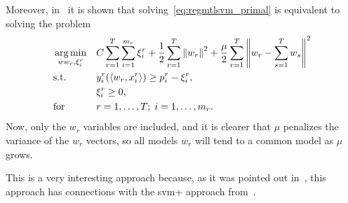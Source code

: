 Moreover, in~\cite{EvgeniouP04} it is shown that solving~\eqref{eq:regmtlsvm_primal} is equivalent to solving the problem
\begin{equation}
    \nonumber
    \begin{aligned}
        & \operatorname*{arg\min}_{ww_r, \xi_i^r}
        & & C \sum_{r=1}^T \sum_{i=1}^{m_r} \xi_i^r +  \frac{1}{2} \sum_{r=1}^T \left\lVert w_r\right\rVert^2 + \frac{\mu}{2} \sum_{r=1}^T  \left\lVert w_r - \sum_{s=1}^T w_s\right\rVert^2 \\
        & \text{s.t.}
        & & y_{i}^r ( \left\langle w_r, x_{i}^r \right\rangle) \geq p_i^r - \xi_i^r ,\\
        & & &\xi_i^r \geq 0, \\
        & \text{for } & & r=1, \ldots, T; \; i=1, \ldots, m_r.
    \end{aligned}
\end{equation}
Now, only the $w_r$ variables are included, and it is clearer that $\mu$ penalizes the variance of the $w_r$ vectors, so all models $w_r$ will tend to a common model as $\mu$ grows.

This is a very interesting approach because, as it was pointed out in~\cite{LiangC08}, this approach has connections with the \acrshort{svm}+ approach from~\cite{VapnikI15a}.


